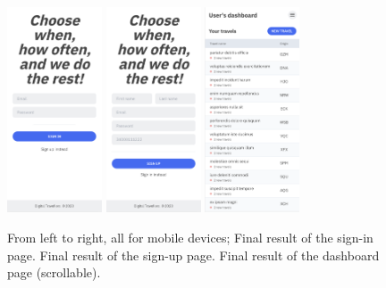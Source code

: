 \documentclass[./memory.tex]{subfiles}
\begin{document}
\begin{figure}[H]
	\centering
	\includegraphics[width=0.25\textwidth]{./assets/results/mobile-sign-in.png}
	\hspace*{12pt}
	\includegraphics[width=0.25\textwidth]{./assets/results/mobile-sign-up.png}
	\hspace*{12pt}
	\includegraphics[width=0.25\textwidth]{./assets/results/mobile-dashboard.png}
	\caption{From left to right, all for mobile devices; Final result of the
		sign-in page. Final result of the sign-up page. Final result of the
		dashboard page (scrollable).}
\end{figure}
\end{document}
